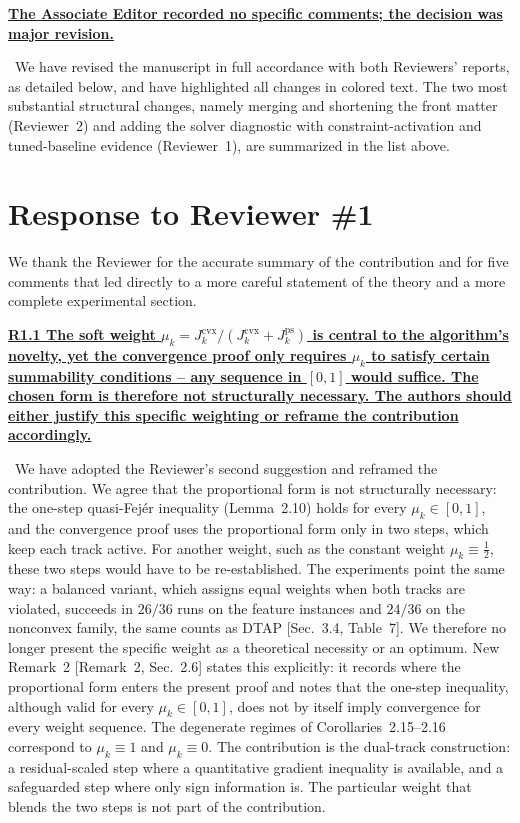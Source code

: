 \documentclass[11pt]{article}
\newcommand{\response}[1]{\smallskip\noindent{\color{blue!60!black}\textbf{Response.}}\ #1\par\medskip}
\newcommand{\loc}[1]{\textcolor{blue!50!black}{[#1]}}
\newenvironment{point}[1]{\medskip\noindent\textbf{\uline{#1}}\par}{\par}
\begin{document}
\begin{point}{The Associate Editor recorded no specific comments; the decision was major revision.}
\response{We have revised the manuscript in full accordance with both Reviewers' reports, as detailed below, and have highlighted all changes in colored text. The two most substantial structural changes, namely merging and shortening the front matter (Reviewer~2) and adding the solver diagnostic with constraint-activation and tuned-baseline evidence (Reviewer~1), are summarized in the list above.}
\end{point}

\section*{Response to Reviewer \#1}

\noindent We thank the Reviewer for the accurate summary of the contribution and for five comments that led directly to a more careful statement of the theory and a more complete experimental section.

\begin{point}{R1.1 The soft weight $\mu_k=J_k^{\mathrm{cvx}}/(J_k^{\mathrm{cvx}}+J_k^{\mathrm{ps}})$ is central to the algorithm's novelty, yet the convergence proof only requires $\mu_k$ to satisfy certain summability conditions -- any sequence in $[0,1]$ would suffice. The chosen form is therefore not structurally necessary. The authors should either justify this specific weighting or reframe the contribution accordingly.}
\response{We have adopted the Reviewer's second suggestion and reframed the contribution. We agree that the proportional form is not structurally necessary: the one-step quasi-Fej\'er inequality (Lemma~2.10) holds for every $\mu_k\in[0,1]$, and the convergence proof uses the proportional form only in two steps, which keep each track active. For another weight, such as the constant weight $\mu_k\equiv\tfrac12$, these two steps would have to be re-established. The experiments point the same way: a balanced variant, which assigns equal weights when both tracks are violated, succeeds in $26/36$ runs on the feature instances and $24/36$ on the nonconvex family, the same counts as DTAP \loc{Sec.~3.4, Table~7}. We therefore no longer present the specific weight as a theoretical necessity or an optimum. New Remark~2 \loc{Remark~2, Sec.~2.6} states this explicitly: it records where the proportional form enters the present proof and notes that the one-step inequality, although valid for every $\mu_k\in[0,1]$, does not by itself imply convergence for every weight sequence. The degenerate regimes of Corollaries~2.15--2.16 correspond to $\mu_k\equiv1$ and $\mu_k\equiv0$. The contribution is the dual-track construction: a residual-scaled step where a quantitative gradient inequality is available, and a safeguarded step where only sign information is. The particular weight that blends the two steps is not part of the contribution.}
\end{point}
\end{document}
